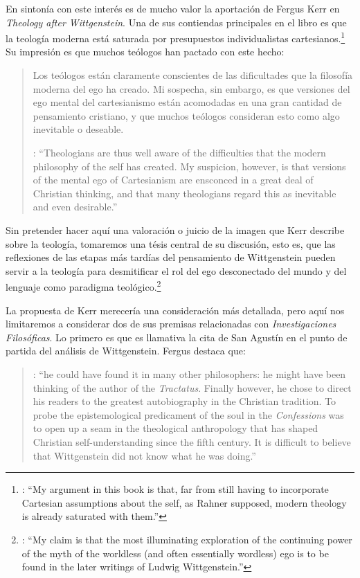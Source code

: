 En sintonía con este interés es de mucho valor la aportación de Fergus Kerr en \emph{Theology after Wittgenstein}. Una de sus contiendas principales en el libro es que la teología moderna está saturada por presupuestos individualistas cartesianos.\footnote{\cite[Cf.~][8]{kerr1997theo}: \enquote{My argument in this book is that, far from still having to incorporate Cartesian assumptions about the self, as Rahner supposed, modern theology is already saturated with them.}} Su impresión es que muchos teólogos han pactado con este hecho:\blockquote[{\cite[10]{kerr1997theo}}: \enquote{Theologians are thus well aware of the difficulties that the modern philosophy of the self has created. My suspicion, however, is that versions of the mental ego of Cartesianism are ensconced in a great deal of Christian thinking, and that many theologians regard this as inevitable and even desirable.}]{Los teólogos están claramente conscientes de las dificultades que la filosofía moderna del ego ha creado. Mi sospecha, sin embargo, es que versiones del ego mental del cartesianismo están acomodadas en una gran cantidad de pensamiento cristiano, y que muchos teólogos consideran esto como algo inevitable o deseable.} Sin pretender hacer aquí una valoración o juicio de la imagen que Kerr describe sobre la teología, tomaremos una tésis central de su discusión, esto es, que las reflexiones de las etapas más tardías del pensamiento de Wittgenstein pueden servir a la teología para desmitificar el rol del ego desconectado del mundo y del lenguaje como paradigma teológico.\footnote{\cite[Cf.~][23]{kerr1997theo}: \enquote{My claim is that the most illuminating exploration of the continuing power of the myth of the worldless (and often essentially wordless) ego is to be found in the later writings of Ludwig Wittgenstein.}}

La propuesta de Kerr merecería una consideración más detallada, pero aquí nos limitaremos a considerar dos de sus premisas relacionadas con \emph{Investigaciones Filosóficas}. Lo primero es que es llamativa la cita de San Agustín en el punto de partida del análisis de Wittgenstein. Fergus destaca que:
\blockquote[{\cite[42]{kerr1997theo}}: \enquote{he could have found it in many other philosophers: he might have been thinking of the author of the \emph{Tractatus}. Finally however, he chose to direct his readers to the greatest autobiography in the Christian tradition. To probe the epistemological predicament of the soul in the \emph{Confessions} was to open up a seam in the theological anthropology that has shaped Christian self-understanding since the fifth century. It is difficult to believe that Wittgenstein did not know what he was doing.}]{}

